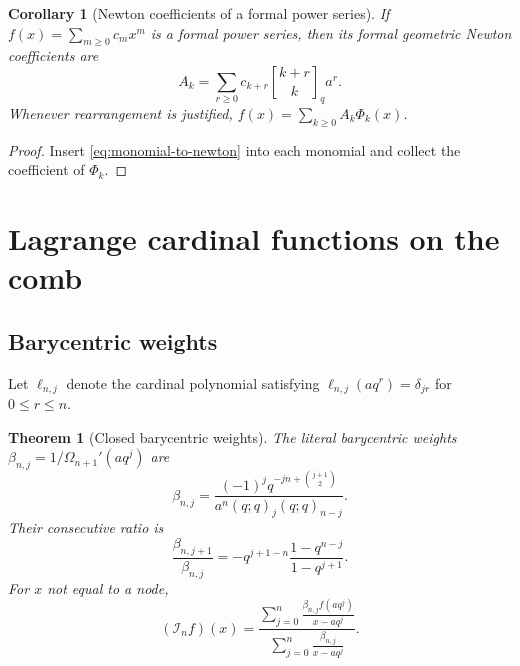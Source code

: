 \documentclass[11pt,a4paper,oneside]{article}
\newtheorem{theorem}{Theorem}[section]
\newtheorem{corollary}[corollary]{Corollary}
\theoremstyle{definition}
\theoremstyle{remark}
\newcommand{\Iop}{\mathcal I}
\newcommand{\qbinom}[3]{\genfrac{[}{]}{0pt}{}{#1}{#2}_{#3}}
\begin{document}
\begin{corollary}[Newton coefficients of a formal power series]
\label{cor:formal-newton-coefficients}
If $f(x)=\sum_{m\ge0}c_mx^m$ is a formal power series, then its formal
geometric Newton coefficients are
\begin{equation}
 A_k=\sum_{r\ge0}c_{k+r}\qbinom{k+r}{k}q a^r.
 \label{eq:formal-Ak}
\end{equation}
Whenever rearrangement is justified,
$f(x)=\sum_{k\ge0}A_k\Phi_k(x)$.
\end{corollary}

\begin{proof}
Insert \eqref{eq:monomial-to-newton} into each monomial and collect the
coefficient of $\Phi_k$.
\end{proof}

\section{Lagrange cardinal functions on the comb}
\label{sec:lagrange}

\subsection{Barycentric weights}

Let $\ell_{n,j}$ denote the cardinal polynomial satisfying
$\ell_{n,j}(aq^r)=\delta_{jr}$ for $0\le r\le n$.

\begin{theorem}[Closed barycentric weights]
\label{thm:barycentric}
The literal barycentric weights
$\beta_{n,j}=1/\Omega_{n+1}'(aq^j)$ are
\begin{equation}
 \beta_{n,j}
 =\frac{(-1)^jq^{-jn+\binom{j+1}{2}}}
 {a^n(q;q)_j(q;q)_{n-j}}.
 \label{eq:barycentric-weights}
\end{equation}
Their consecutive ratio is
\begin{equation}
 \frac{\beta_{n,j+1}}{\beta_{n,j}}
 =-q^{j+1-n}\frac{1-q^{n-j}}{1-q^{j+1}}.
 \label{eq:barycentric-ratio}
\end{equation}
For $x$ not equal to a node,
\begin{equation}
 (\Iop_nf)(x)=
 \frac{\displaystyle\sum_{j=0}^n
       \frac{\beta_{n,j}f(aq^j)}{x-aq^j}}
      {\displaystyle\sum_{j=0}^n
       \frac{\beta_{n,j}}{x-aq^j}}.
 \label{eq:barycentric-formula}
\end{equation}
\end{theorem}
\end{document}

